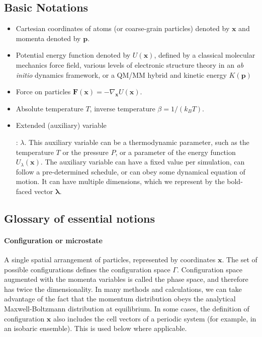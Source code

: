 \documentclass[9pt,review]{livecoms}
\newcommand{\vx}{\mathbf{x}}
\newcommand{\vp}{\mathbf{p}}
\newcommand{\vF}{\mathbf{F}}
\begin{document}
\subsection{Basic Notations}
\label{sec:Notation}
\begin{itemize}
\item Cartesian coordinates of atoms (or coarse-grain particles) denoted by $\vx$ and momenta denoted by $\vp$.
\item Potential energy function denoted by $U(\vx)$, defined by a classical molecular mechanics force field, various levels of electronic structure theory in an \emph{ab initio} dynamics framework, or a QM/MM hybrid and kinetic energy $K(\vp)$
\item Force on particles $\vF(\vx) = -\nabla_\vx U(\vx)$.
\item Absolute temperature $T$, inverse temperature $\beta = 1/(k_B T)$.
\item \hypertarget{ref:AuxVar} {Extended (auxiliary) variable}: $\lambda$. This auxiliary variable can be a thermodynamic parameter, such as the temperature $T$ or the pressure $P$, or a parameter of the energy function $U_\lambda(\vx)$. The auxiliary variable can have a fixed value per simulation, can follow a pre-determined schedule, or can obey some dynamical equation of motion. It can have multiple dimensions, which we represent by the bold-faced vector $\boldsymbol{\lambda}$.

\end{itemize}

\subsection{Glossary of essential notions}
\label{sec:glossary}

\hypertarget{ref:Microstate} {\paragraph{Configuration or microstate}}
A single spatial arrangement of particles, represented by coordinates $\vx$. The set of possible configurations defines the configuration space $\Gamma$.
Configuration space augmented with the momenta variables is called the phase space, and therefore has twice the dimensionality. In many methods and calculations, we can take advantage of the fact that the momentum distribution obeys the analytical Maxwell-Boltzmann distribution at equilibrium.
In some cases, the  definition of configuration $\vx$ also includes the cell vectors of a periodic system (for example, in an isobaric ensemble).  This is used below where applicable.
\end{document}
